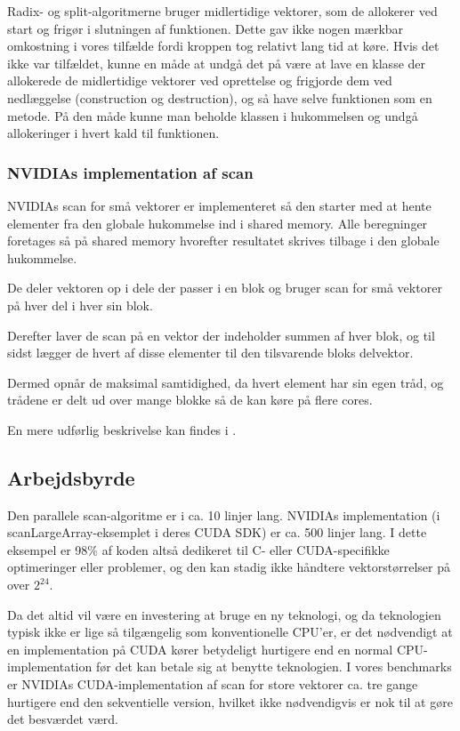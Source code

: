 Radix- og split-algoritmerne bruger midlertidige vektorer, som de allokerer
ved start og frigør i slutningen af funktionen.
Dette gav ikke nogen mærkbar omkostning i vores tilfælde fordi kroppen tog
relativt lang tid at køre. Hvis det ikke var tilfældet, kunne en måde at 
undgå det på være at lave en klasse der allokerede de midlertidige vektorer
ved oprettelse og frigjorde dem ved nedlæggelse (construction og destruction),
og så have selve funktionen som en metode.
På den måde kunne man beholde klassen i hukommelsen og undgå allokeringer
i hvert kald til funktionen.

\subsubsection*{NVIDIAs implementation af scan}

NVIDIAs scan for små vektorer er implementeret så den starter med at hente
elementer fra den globale hukommelse ind i shared memory. Alle beregninger
foretages så på shared memory hvorefter resultatet skrives tilbage i den
globale hukommelse.

De deler vektoren op i dele der passer i en blok og bruger scan for små
vektorer på hver del i hver sin blok.

Derefter laver de scan på en vektor der indeholder summen af hver blok,
og til sidst lægger de hvert af disse elementer til den tilsvarende bloks
delvektor.

Dermed opnår de maksimal samtidighed, da hvert element har sin egen tråd,
og trådene er delt ud over mange blokke så de kan køre på flere cores.

En mere udførlig beskrivelse kan findes i \cite{harris}.

\subsection{Arbejdsbyrde}

Den parallele scan-algoritme er i \cite{gpu-scan} ca. 10 linjer lang. NVIDIAs implementation
(i scanLargeArray-eksemplet i deres CUDA SDK) er ca. 500 linjer lang.
I dette eksempel er 98\% af koden altså dedikeret til C- eller CUDA-specifikke 
optimeringer eller problemer, og den kan stadig ikke håndtere vektorstørrelser på over 
$2^{24}$.

Da det altid vil være en investering at bruge en ny teknologi, og da teknologien typisk
ikke er lige så tilgængelig som konventionelle CPU'er, er det nødvendigt at en 
implementation på CUDA kører betydeligt hurtigere end en normal CPU-implementation før
det kan betale sig at benytte teknologien.
I vores benchmarks er NVIDIAs CUDA-implementation af scan for store vektorer ca. tre gange 
hurtigere end den sekventielle version, hvilket ikke nødvendigvis er nok til at gøre det
besværdet værd.

